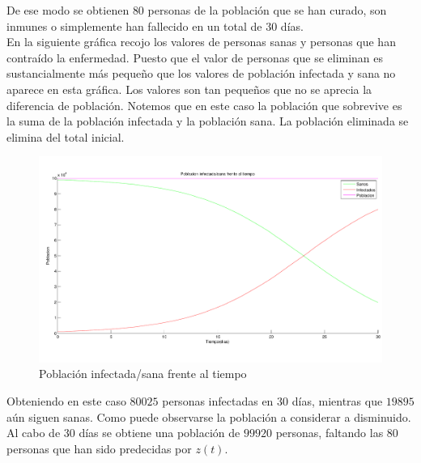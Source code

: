 \documentclass[a4paper,11pt]{article}
\numberwithin{equation}{section}
\begin{document}
\indent De ese modo se obtienen $ 80 $ personas de la población que se han curado, son inmunes o simplemente han fallecido en un total de 30 días. \\

\indent En la siguiente gráfica recojo los valores de personas sanas y personas que han contraído la enfermedad. Puesto que el valor de personas que se eliminan es sustancialmente más pequeño que los valores de población infectada y sana no aparece en esta gráfica. Los valores son tan pequeños que no se aprecia la diferencia de población. Notemos que en este caso la población que sobrevive es la suma de la población infectada y la población sana. La población eliminada se elimina del total inicial.\\
\begin{figure}[h!]
	\centering 		
	\includegraphics[width=1\textwidth]{grafica5.pdf}
	\caption{Población infectada/sana frente al tiempo}
	\label{Fig:5}
\end{figure}

\newpage
\indent Obteniendo en este caso $ 80025 $ personas infectadas en 30 días, mientras que $ 19895 $ aún siguen sanas. Como puede observarse la población a considerar a disminuido. Al cabo de 30 días se obtiene una población de $ 99920 $ personas, faltando las $ 80 $ personas que han sido predecidas por $ z(t) $.
\end{document}
